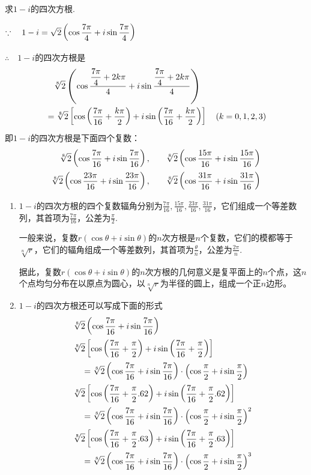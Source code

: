 \begin{example}
    求$1-i$的四次方根.
\end{example}

\begin{solution}
    $\because\quad 1-i=\sqrt{2}\left(\cos\dfrac{7\pi}{4}+i\sin\dfrac{7\pi}{4}\right)$

$\therefore\quad 1-i$的四次方根是
\[\begin{split}
   &\quad  \sqrt[8]{2}\left(\cos\dfrac{\dfrac{7\pi}{4}+2k\pi}{4}+i\sin\dfrac{\dfrac{7\pi}{4}+2k\pi}{4}\right)\\
    & =\sqrt[8]{2}\left[\cos\left(\dfrac{7\pi}{16}+\dfrac{k\pi}{2}\right)+i\sin\left(\dfrac{7\pi}{16}+\dfrac{k\pi}{2}\right)\right]\quad (k=0,1,2,3)
\end{split}\]
即$1-i$的四次方根是下面四个复数：
\[\begin{split}
    \sqrt[8]{2}\left(\cos\dfrac{7\pi}{16}+i\sin\dfrac{7\pi}{16}\right),&\qquad     \sqrt[8]{2}\left(\cos\dfrac{15\pi}{16}+i\sin\dfrac{15\pi}{16}\right)\\
    \sqrt[8]{2}\left(\cos\dfrac{23\pi}{16}+i\sin\dfrac{23\pi}{16}\right),&\qquad     \sqrt[8]{2}\left(\cos\dfrac{31\pi}{16}+i\sin\dfrac{31\pi}{16}\right)
\end{split}\]
\end{solution}

\begin{note}
\begin{enumerate}[(1)]
    \item $1-i$的四次方根的四个复数辐角分别为$\frac{7\pi}{16},\frac{15\pi}{16},\frac{23\pi}{16},\frac{31\pi}{16}$，它们组成一个等差数列，其首项为$\frac{7\pi}{16}$，公差为$\frac{\pi}{2}$.
    
    一般来说，复数$r(\cos\theta+i\sin\theta)$的$n$次方根是$n$个复数，它们的模都等于$\sqrt[n]{r}$，它们的辐角组成一个等差数列，其首项为$\frac{\theta}{n}$，公差为$\frac{2\pi}{n}$.

    据此，复数$r(\cos\theta+i\sin\theta)$的$n$次方根的几何意义是复平面上的$n$个点，这$n$个点均匀分布在以原点为圆心，以$\sqrt[n]{r}$为半径的圆上，组成一个正$n$边形。
    \item $1-i$的四次方根还可以写成下面的形式
\[\begin{split}
    &\sqrt[8]{2}\left(\cos\dfrac{7\pi}{16}+i\sin\dfrac{7\pi}{16}\right)\\
    &\sqrt[8]{2}\left[\cos\left(\dfrac{7\pi}{16}+\dfrac{\pi}{2}\right)+i\sin\left(\dfrac{7\pi}{16}+\dfrac{\pi}{2}\right)\right]\\
    &\quad=\sqrt[8]{2}\left(\cos\dfrac{7\pi}{16}+i\sin\dfrac{7\pi}{16}\right)\cdot \left(\cos\dfrac{\pi}{2}+i\sin\dfrac{\pi}{2}\right)\\
    &\sqrt[8]{2}\left[\cos\left(\dfrac{7\pi}{16}+\dfrac{\pi}{2}.6 2\right)+i\sin\left(\dfrac{7\pi}{16}+\dfrac{\pi}{2}.6 2\right)\right]\\
    &\quad=\sqrt[8]{2}\left(\cos\dfrac{7\pi}{16}+i\sin\dfrac{7\pi}{16}\right)\cdot \left(\cos\dfrac{\pi}{2}+i\sin\dfrac{\pi}{2}\right)^2\\
    &\sqrt[8]{2}\left[\cos\left(\dfrac{7\pi}{16}+\dfrac{\pi}{2}.6 3\right)+i\sin\left(\dfrac{7\pi}{16}+\dfrac{\pi}{2}.6 3\right)\right]\\
    &\quad=\sqrt[8]{2}\left(\cos\dfrac{7\pi}{16}+i\sin\dfrac{7\pi}{16}\right)\cdot \left(\cos\dfrac{\pi}{2}+i\sin\dfrac{\pi}{2}\right)^3\\
\end{split}\]
\end{enumerate}
\end{note}


